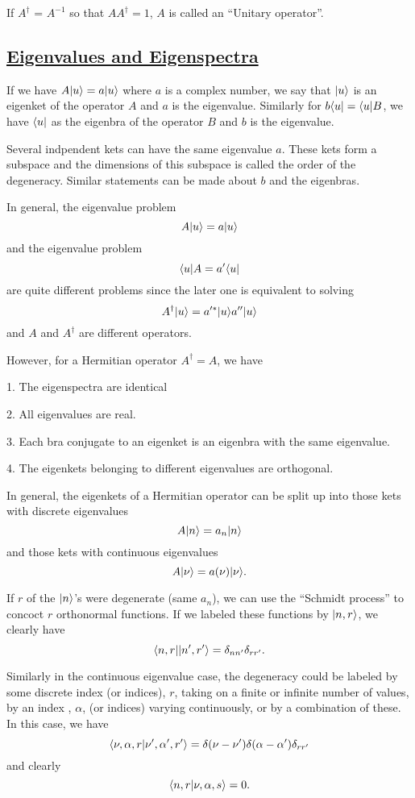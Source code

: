 If $A^\dagger$ = $A^{-1}$ so that $AA^\dagger = 1$, $A$ is called an ``Unitary operator''.

\subsection{\underline{Eigenvalues and Eigenspectra}}
If we have $A|u\rangle = a|u\rangle$ where $a$ is a complex number, we say that $|u\rangle$ is an eigenket of the operator $A$ and $a$ is the eigenvalue. Similarly for $b\langle u| = \langle u| B$, we have $\langle u|$ as the eigenbra
of the operator $B$ and $b$ is the eigenvalue. 

Several indpendent kets can have the same eigenvalue $a$. These kets form a subspace and the dimensions of this subspace is called the order of the degeneracy. Similar statements can be made about $b$ and the eigenbras. 

In general, the eigenvalue problem $$A|u\rangle = a|u\rangle$$ and the eigenvalue problem $$\langle u|A = a' \langle u|$$ are quite different problems since the later one is equivalent to solving
$$A^\dagger|u\rangle = a'^*|u\rangle a''|u\rangle$$ and $A$ and $A^\dagger$ are different operators. 

However, for a Hermitian operator $A^\dagger = A$, we have

1. The eigenspectra are identical

2. All eigenvalues are real.

3. Each bra conjugate to an eigenket is an eigenbra with the same eigenvalue.

4. The eigenkets belonging to different eigenvalues are orthogonal.

In general, the eigenkets of a Hermitian operator can be split up into those kets with discrete eigenvalues $$A|n\rangle = a_n |n\rangle$$ and those kets with continuous eigenvalues $$A|\nu\rangle = a(\nu)|\nu\rangle.$$

If $r$ of the $|n\rangle$'s were degenerate (same $a_n$), we can use the ``Schmidt process'' to concoct $r$ orthonormal functions. If we labeled these functions by $|n,r\rangle$, we clearly have
$$\langle n,r||n',r'\rangle = \delta_{nn'} \delta_{rr'}.$$

Similarly in the continuous eigenvalue case, the degeneracy could be labeled by some discrete index (or indices), $r$, taking on a finite or infinite number of values, by an index , $\alpha$, (or indices) varying continuously, or by a 
combination of these. In this case, we have
$$\langle \nu,\alpha,r|\nu',\alpha',r'\rangle = \delta(\nu-\nu')\delta(\alpha-\alpha')\delta_{rr'}$$ and clearly 
$$\langle n,r|\nu,\alpha, s\rangle = 0.$$

